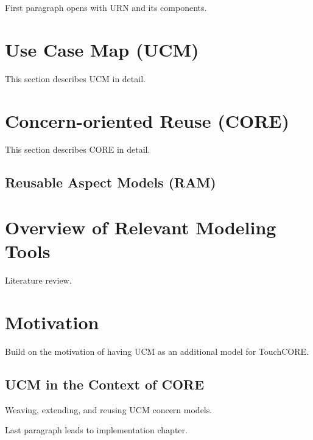 First paragraph opens with URN and its components.


\section{Use Case Map (UCM)}

This section describes UCM in detail.

\section{Concern-oriented Reuse (CORE)}

This section describes CORE in detail.

\subsection{Reusable Aspect Models (RAM)}

\section{Overview of Relevant Modeling Tools}

Literature review.

\section{Motivation}

Build on the motivation of having UCM as an additional model for TouchCORE.

\subsection{UCM in the Context of CORE}

Weaving, extending, and reusing UCM concern models.

Last paragraph leads to implementation chapter.
